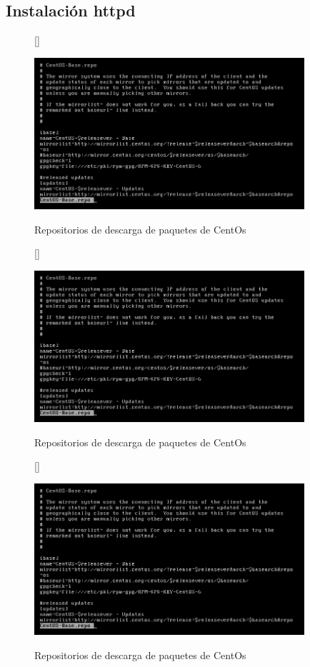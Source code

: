 \documentclass[11pt]{article}
\begin{document}
\subsection{Instalación httpd}
\begin{figure}[ht]
[\FBwidth]
{\caption{Repositorios de descarga de paquetes de CentOs}\label{fig:repositorios}}
{\includegraphics[width=10cm]{screenshots/httpd-install/repositorios-centos.png}}
\end{figure}

\begin{figure}[ht]
[\FBwidth]
{\caption{Repositorios de descarga de paquetes de CentOs}\label{fig:repositorios}}
{\includegraphics[width=10cm]{screenshots/httpd-install/repositorios-centos.png}}
\end{figure}

\begin{figure}[ht]
[\FBwidth]
{\caption{Repositorios de descarga de paquetes de CentOs}\label{fig:repositorios}}
{\includegraphics[width=10cm]{screenshots/httpd-install/repositorios-centos.png}}
\end{figure}
\end{document}
